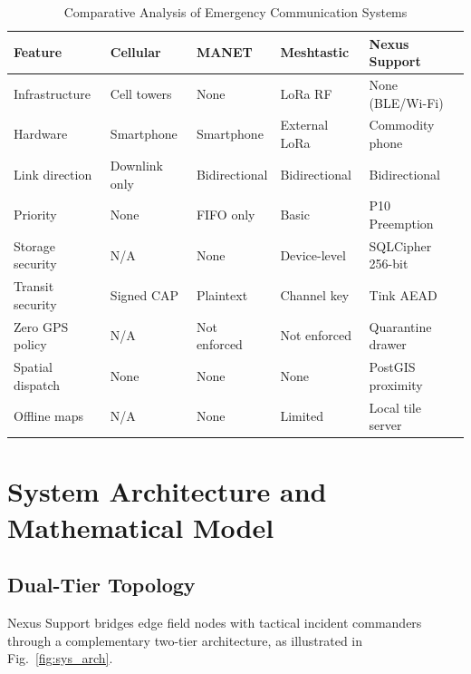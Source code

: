 \documentclass[conference,a4paper]{IEEEtran}
\begin{document}
\begin{table}[htbp]
\caption{Comparative Analysis of Emergency Communication Systems}
\label{tab:comparison}
\centering
\scriptsize
\setlength{\tabcolsep}{3pt}
\begin{tabularx}{\columnwidth}{lYYYY}
\toprule
\textbf{Feature} & \textbf{Cellular} & \textbf{MANET} & \textbf{Meshtastic} & \textbf{Nexus Support} \\
\midrule
Infrastructure & Cell towers & None & LoRa RF & None (BLE/Wi-Fi) \\
Hardware & Smartphone & Smartphone & External LoRa & Commodity phone \\
Link direction & Downlink only & Bidirectional & Bidirectional & Bidirectional \\
Priority & None & FIFO only & Basic & P10 Preemption \\
Storage security & N/A & None & Device-level & SQLCipher 256-bit \\
Transit security & Signed CAP & Plaintext & Channel key & Tink AEAD \\
Zero GPS policy & N/A & Not enforced & Not enforced & Quarantine drawer \\
Spatial dispatch & None & None & None & PostGIS proximity \\
Offline maps & N/A & None & Limited & Local tile server \\
\bottomrule
\end{tabularx}
\end{table}

\section{System Architecture and Mathematical Model}
\subsection{Dual-Tier Topology}
Nexus Support bridges edge field nodes with tactical incident commanders through a complementary two-tier architecture, as illustrated in Fig.~\ref{fig:sys_arch}.
\end{document}
